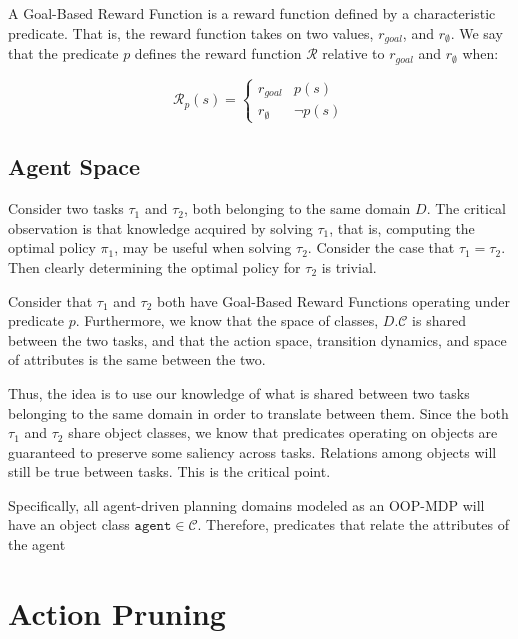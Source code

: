 \documentclass[11pt]{article}
\begin{document}
{ A \textup{Goal-Based Reward Function} is a reward function defined by a characteristic predicate. That is, the reward function takes on two values, $r_{goal}$, and $r_{\emptyset}$. We say that the predicate $p$ defines the reward function $\mathcal{R}$ relative to $r_{goal}$ and $r_\emptyset$ when:

\begin{equation}
\mathcal{R}_p(s) = \begin{cases}
r_{goal}& p(s) \\
r_{\emptyset}&\neg p(s)
\end{cases}
\end{equation}}


\subsection{Agent Space}
Consider two tasks $\tau_1$ and $\tau_2$, both belonging to the same domain $D$. The critical observation is that knowledge acquired by solving $\tau_1$, that is, computing the optimal policy $\pi_1$, may be useful when solving $\tau_2$. Consider the case that $\tau_1 = \tau_2$. Then clearly determining the optimal policy for $\tau_2$ is trivial.

Consider that $\tau_1$ and $\tau_2$ both have Goal-Based Reward Functions operating under predicate $p$. Furthermore, we know that the space of classes, $D.\mathcal{C}$ is shared between the two tasks, and that the action space, transition dynamics, and space of attributes is the same between the two.

Thus, the idea is to use our knowledge of what is shared between two tasks belonging to the same domain in order to translate between them. Since the both $\tau_1$ and $\tau_2$ share object classes, we know that predicates operating on objects are guaranteed to preserve some saliency across tasks. Relations among objects will still be true between tasks. This is the critical point.

Specifically, all agent-driven planning domains modeled as an OOP-MDP will have an object class $\texttt{agent} \in \mathcal{C}$. Therefore, predicates that relate the attributes of the agent 

\section{Action Pruning}
\label{sec:action_pruning}


\end{document}
